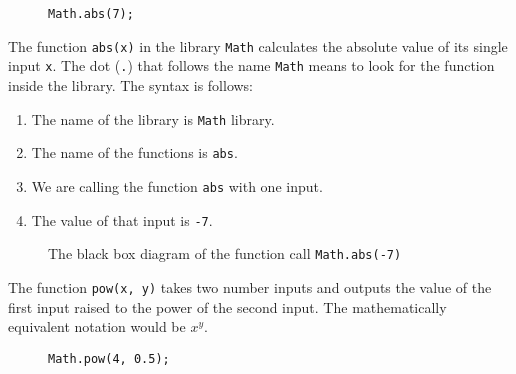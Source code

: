 \documentclass{amsart}
\makeatletter
\def\tikzscale{1}\begin{lrbox}{\measure@tikzpicture}%
\edef\tikzscale{\pgfmathresult}%
\makeatother
\begin{document}
\begin{figure}[h]
\begin{lstlisting}
Math.abs(7);
\end{lstlisting}
\end{figure}

The function \texttt{abs(x)} in the library \texttt{Math} calculates the absolute value of its single input \texttt{x}. The dot (\texttt{.}) that follows the name \texttt{Math} means to look for the function inside the library. The syntax is follows:

\begin{enumerate}
  \item The name of the library is \texttt{Math} library.
  \item The name of the functions is \texttt{abs}.
  \item We are calling the function \texttt{abs} with one input.
  \item The value of that input is \texttt{-7}.
\end{enumerate}

\begin{figure}[h]
\begin{scaletikzpicturetowidth}{\textwidth}
\end{scaletikzpicturetowidth}
\caption{The black box diagram of the function call \texttt{Math.abs(-7)}}
\end{figure}


The function \texttt{pow(x, y)} takes two number inputs and outputs the value of the first input raised to the power of the second input. The mathematically equivalent notation would be $x^y$.

\begin{figure}[h]
\begin{lstlisting}
Math.pow(4, 0.5);
\end{lstlisting}
\end{figure}
\end{document}
